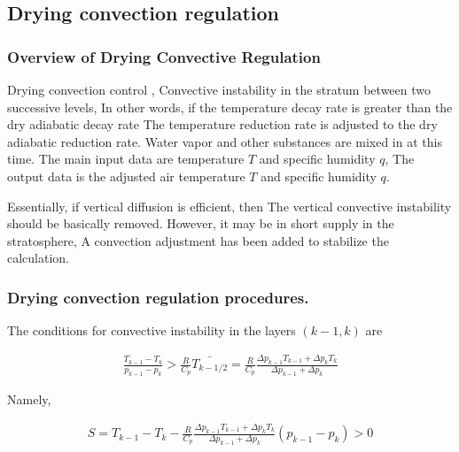 \hypertarget{drying-convection-regulation}{%
\subsection{Drying convection
regulation}\label{drying-convection-regulation}}

\hypertarget{overview-of-drying-convective-regulation}{%
\subsubsection{Overview of Drying Convective
Regulation}\label{overview-of-drying-convective-regulation}}

Drying convection control , Convective instability in the stratum
between two successive levels, In other words, if the temperature decay
rate is greater than the dry adiabatic decay rate The temperature
reduction rate is adjusted to the dry adiabatic reduction rate. Water
vapor and other substances are mixed in at this time. The main input
data are temperature \(T\) and specific humidity \(q\), The output data
is the adjusted air temperature \(T\) and specific humidity \(q\).

Essentially, if vertical diffusion is efficient, then The vertical
convective instability should be basically removed. However, it may be
in short supply in the stratosphere, A convection adjustment has been
added to stabilize the calculation.

\hypertarget{drying-convection-regulation-procedures.}{%
\subsubsection{Drying convection regulation
procedures.}\label{drying-convection-regulation-procedures.}}

The conditions for convective instability in the layers \((k-1,k)\) are

\begin{eqnarray}
\frac{T_{k-1} - T_{k}}{p_{k-1} - p_{k}} 
  > \frac{R}{C_p} \bar{T_{k-1/2}}
  = \frac{R}{C_p}
    \frac{\Delta p_{k-1} T_{k-1} + \Delta p_{k} T_{k}}
         {\Delta p_{k-1} + \Delta p_{k}} 
\end{eqnarray}

Namely,

\begin{eqnarray}
 S = T_{k-1} - T_{k}
     - \frac{R}{C_p} 
        \frac{\Delta p_{k-1} T_{k-1} + \Delta p_{k} T_{k}}
         {\Delta p_{k-1} + \Delta p_{k}} 
       (p_{k-1} - p_{k})
   > 0 
\end{eqnarray}

